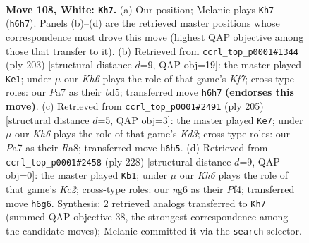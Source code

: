 \documentclass[11pt]{article}
\begin{document}
\clearpage

\begin{figure}[p]\centering
\begin{subfigure}{0.46\textwidth}\centering
\resizebox{\linewidth}{!}{%
\newchessgame
\chessboard[
  setfen={5k2/P7/6nK/8/8/8/8/8 w - - 6 108},
  showmover=false,
  pgfstyle=straightmove, color=movearrow, markmove={h6-h7}
]}
\caption{}
\end{subfigure}\hfill
\begin{subfigure}{0.46\textwidth}\centering
\resizebox{\linewidth}{!}{%
\newchessgame
\chessboard[
  setfen={8/8/8/3B4/8/3K4/4Nk2/8 b - - 31 102},
  showmover=false,
  pgfstyle=straightmove, color=movearrow, markmove={f2-e1}
]}
\caption{}
\end{subfigure}
\\[4pt]
\begin{subfigure}{0.46\textwidth}\centering
\resizebox{\linewidth}{!}{%
\newchessgame
\chessboard[
  setfen={r7/8/3k4/8/2K5/8/3N4/8 b - - 1 103},
  showmover=false,
  pgfstyle=straightmove, color=movearrow, markmove={d6-e7}
]}
\caption{}
\end{subfigure}\hfill
\begin{subfigure}{0.46\textwidth}\centering
\resizebox{\linewidth}{!}{%
\newchessgame
\chessboard[
  setfen={8/8/8/2k5/5P2/8/2K5/8 w - - 0 115},
  showmover=false,
  pgfstyle=straightmove, color=movearrow, markmove={c2-b1}
]}
\caption{}
\end{subfigure}
\caption{\textbf{Move 108, White: \texttt{Kh7}.} (a) Our position; Melanie plays \texttt{Kh7} (\texttt{h6h7}). Panels (b)--(d) are the retrieved master positions whose correspondence most drove this move (highest QAP objective among those that transfer to it). (b) Retrieved from \texttt{ccrl\_top\_p0001\#1344} (ply 203) [structural distance $d$=9, QAP obj=19]: the master played \texttt{Ke1}; under $\mu$ our \emph{Kh6} plays the role of that game's \emph{Kf7}; cross-type roles: our \emph{P}a7 as their \emph{b}d5; transferred move \texttt{h6h7} \textbf{(endorses this move)}. (c) Retrieved from \texttt{ccrl\_top\_p0001\#2491} (ply 205) [structural distance $d$=5, QAP obj=3]: the master played \texttt{Ke7}; under $\mu$ our \emph{Kh6} plays the role of that game's \emph{Kd3}; cross-type roles: our \emph{P}a7 as their \emph{R}a8; transferred move \texttt{h6h5}. (d) Retrieved from \texttt{ccrl\_top\_p0001\#2458} (ply 228) [structural distance $d$=9, QAP obj=0]: the master played \texttt{Kb1}; under $\mu$ our \emph{Kh6} plays the role of that game's \emph{Kc2}; cross-type roles: our \emph{n}g6 as their \emph{P}f4; transferred move \texttt{h6g6}. Synthesis: 2 retrieved analogs transferred to \texttt{Kh7} (summed QAP objective 38, the strongest correspondence among the candidate moves); Melanie committed it via the \texttt{search} selector.}
\label{fig:thought-m214}
\end{figure}
\end{document}
